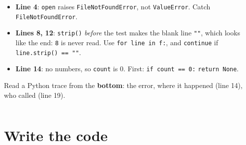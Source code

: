 \documentclass[aspectratio=169]{beamer}
\newcommand{\code}[1]{\texttt{#1}}
\begin{document}
\begin{frame}
\begin{columns}[T,onlytextwidth]
\begin{onlyenv}
\begin{itemize}[itemsep=0.25em, leftmargin=1em]
      \item \textbf{Line 4}: \code{open} raises \code{FileNotFoundError}, not
            \code{ValueError}. Catch \code{FileNotFoundError}.
      \item \textbf{Lines 8, 12}: \code{strip()} \emph{before} the test makes the
            blank line \code{""}, which looks like the end: \code{8} is never read.
            Use \code{for line in f:}, and \code{continue} if
            \code{line.strip() == ""}.
      \item \textbf{Line 14}: no numbers, so \code{count} is 0. First:
            \code{if count == 0:} \code{return None}.
    \end{itemize}
    {\footnotesize Read a Python trace from the \textbf{bottom}: the error, where it
    happened (line 14), who called (line 19).}
    \end{onlyenv}
  \end{columns}
\end{frame}

\section{Write the code}
\end{document}
